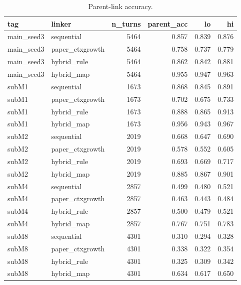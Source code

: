 \begin{table}
\caption{Parent-link accuracy.}
\label{tab:parent}
\begin{tabular}{llrrrr}
\toprule
tag & linker & n\_turns & parent\_acc & lo & hi \\
\midrule
main\_seed3 & sequential & 5464 & 0.857 & 0.839 & 0.876 \\
main\_seed3 & paper\_ctxgrowth & 5464 & 0.758 & 0.737 & 0.779 \\
main\_seed3 & hybrid\_rule & 5464 & 0.862 & 0.842 & 0.881 \\
main\_seed3 & hybrid\_map & 5464 & 0.955 & 0.947 & 0.963 \\
subM1 & sequential & 1673 & 0.868 & 0.845 & 0.891 \\
subM1 & paper\_ctxgrowth & 1673 & 0.702 & 0.675 & 0.733 \\
subM1 & hybrid\_rule & 1673 & 0.888 & 0.865 & 0.913 \\
subM1 & hybrid\_map & 1673 & 0.956 & 0.943 & 0.967 \\
subM2 & sequential & 2019 & 0.668 & 0.647 & 0.690 \\
subM2 & paper\_ctxgrowth & 2019 & 0.578 & 0.552 & 0.605 \\
subM2 & hybrid\_rule & 2019 & 0.693 & 0.669 & 0.717 \\
subM2 & hybrid\_map & 2019 & 0.885 & 0.867 & 0.901 \\
subM4 & sequential & 2857 & 0.499 & 0.480 & 0.521 \\
subM4 & paper\_ctxgrowth & 2857 & 0.463 & 0.443 & 0.484 \\
subM4 & hybrid\_rule & 2857 & 0.500 & 0.479 & 0.521 \\
subM4 & hybrid\_map & 2857 & 0.767 & 0.751 & 0.783 \\
subM8 & sequential & 4301 & 0.310 & 0.294 & 0.328 \\
subM8 & paper\_ctxgrowth & 4301 & 0.338 & 0.322 & 0.354 \\
subM8 & hybrid\_rule & 4301 & 0.325 & 0.309 & 0.342 \\
subM8 & hybrid\_map & 4301 & 0.634 & 0.617 & 0.650 \\
\bottomrule
\end{tabular}
\end{table}
